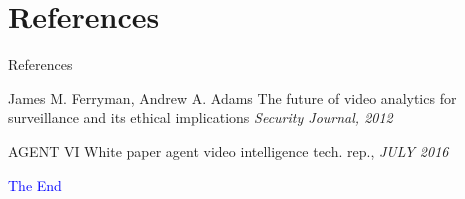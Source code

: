 \documentclass{beamer}
\begin{document}
\section{References}
\begin{frame}{References}
  \footnotesize{
  \begin{thebibliography}{99}
     James  M. Ferryman, Andrew A. Adams
    \newblock The future of video analytics for surveillance and its ethical implications
    \newblock \emph{Security Journal, 2012}

     AGENT VI
    \newblock White paper agent video intelligence tech. rep.,
    \newblock \emph{JULY 2016}

  \end{thebibliography}
  }
\end{frame}


\begin{frame}
\textcolor{blue}{\Huge{\centerline{The End}}}
\end{frame}

\end{document}
